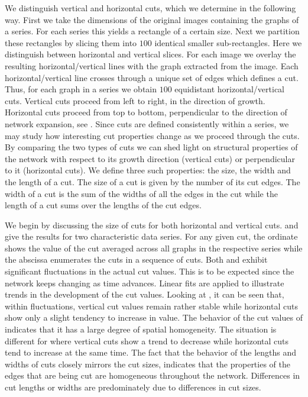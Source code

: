 		We distinguish vertical and horizontal cuts, which we determine in the following way. First we take the dimensions of the original images containing the graphs of a series. For each series this yields a rectangle of a certain size. Next we partition these rectangles by slicing them into $100$ identical smaller sub-rectangles. Here we distinguish between horizontal and vertical slices. For each image we overlay the resulting horizontal/vertical lines with the graph extracted from the image. Each horizontal/vertical line crosses through a unique set of edges which defines a cut. Thus, for each graph in a series we obtain $100$ equidistant horizontal/vertical cuts. Vertical cuts proceed from left to right, \ie in the direction of growth. Horizontal cuts proceed from top to bottom, \ie perpendicular to the direction of network expansion, see . Since cuts are defined consistently within a series, we may study how interesting cut properties change as we proceed through the cuts. By comparing the two types of cuts we can shed light on structural properties of the network with respect to its growth direction (vertical cuts) or perpendicular to it (horizontal cuts). We define three such properties: the size, the width and the length of a cut. The size of a cut is given by the number of its cut edges. The width of a cut is the sum of the widths of all the edges in the cut while the length of a cut sums over the lengths of the cut edges. 

		We begin by discussing the size of cuts for both horizontal and vertical cuts.  and  give the results for two characteristic data series. For any given cut, the ordinate shows the value of the cut averaged across all graphs in the respective series while the abscissa enumerates the cuts in a sequence of cuts. Both  and  exhibit significant fluctuations in the actual cut values. This is to be expected since the network keeps changing as time advances. Linear fits are applied to illustrate trends in the development of the cut values. Looking at , it can be seen that, within fluctuations, vertical cut values remain rather stable while horizontal cuts show only a slight tendency to increase in value. The behavior of the cut values of  indicates that it has a large degree of spatial homogeneity. The situation is different for  where vertical cuts show a trend to decrease while horizontal cuts tend to increase at the same time. The fact that the behavior of the lengths and widths of cuts closely mirrors the cut sizes, indicates that the properties of the edges that are being cut are homogeneous throughout the network. Differences in cut lengths or widths are predominately due to differences in cut sizes.

